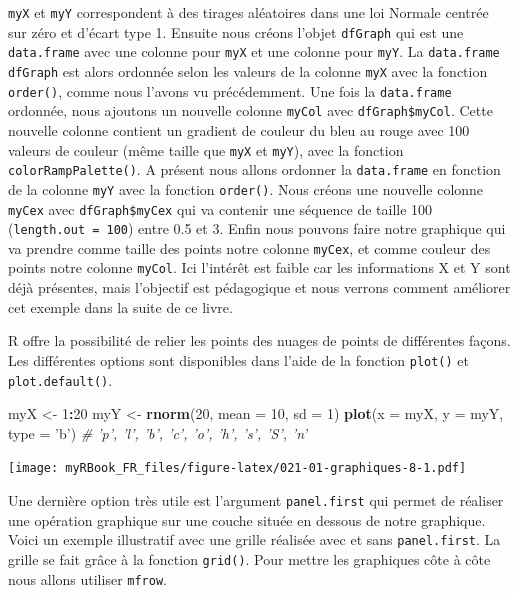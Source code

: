 \documentclass[
]{book}
\newenvironment{Shaded}{\begin{snugshade}}{\end{snugshade}}
\newcommand{\CommentTok}[1]{\textcolor[rgb]{0.56,0.35,0.01}{\textit{#1}}}
\newcommand{\DataTypeTok}[1]{\textcolor[rgb]{0.13,0.29,0.53}{#1}}
\newcommand{\DecValTok}[1]{\textcolor[rgb]{0.00,0.00,0.81}{#1}}
\newcommand{\KeywordTok}[1]{\textcolor[rgb]{0.13,0.29,0.53}{\textbf{#1}}}
\newcommand{\NormalTok}[1]{#1}
\newcommand{\OperatorTok}[1]{\textcolor[rgb]{0.81,0.36,0.00}{\textbf{#1}}}
\newcommand{\StringTok}[1]{\textcolor[rgb]{0.31,0.60,0.02}{#1}}
\begin{document}
\texttt{myX} et \texttt{myY} correspondent à des tirages aléatoires dans une loi Normale centrée sur zéro et d'écart type 1. Ensuite nous créons l'objet \texttt{dfGraph} qui est une \texttt{data.frame} avec une colonne pour \texttt{myX} et une colonne pour \texttt{myY}. La \texttt{data.frame} \texttt{dfGraph} est alors ordonnée selon les valeurs de la colonne \texttt{myX} avec la fonction \texttt{order()}, comme nous l'avons vu précédemment. Une fois la \texttt{data.frame} ordonnée, nous ajoutons un nouvelle colonne \texttt{myCol} avec \texttt{dfGraph\$myCol}. Cette nouvelle colonne contient un gradient de couleur du bleu au rouge avec 100 valeurs de couleur (même taille que \texttt{myX} et \texttt{myY}), avec la fonction \texttt{colorRampPalette()}. A présent nous allons ordonner la \texttt{data.frame} en fonction de la colonne \texttt{myY} avec la fonction \texttt{order()}. Nous créons une nouvelle colonne \texttt{myCex} avec \texttt{dfGraph\$myCex} qui va contenir une séquence de taille 100 (\texttt{length.out\ =\ 100}) entre 0.5 et 3. Enfin nous pouvons faire notre graphique qui va prendre comme taille des points notre colonne \texttt{myCex}, et comme couleur des points notre colonne \texttt{myCol}. Ici l'intérêt est faible car les informations X et Y sont déjà présentes, mais l'objectif est pédagogique et nous verrons comment améliorer cet exemple dans la suite de ce livre.

R offre la possibilité de relier les points des nuages de points de différentes façons. Les différentes options sont disponibles dans l'aide de la fonction \texttt{plot()} et \texttt{plot.default()}.

\begin{Shaded}
\begin{Highlighting}[]
\NormalTok{myX <-}\StringTok{ }\DecValTok{1}\OperatorTok{:}\DecValTok{20}
\NormalTok{myY <-}\StringTok{ }\KeywordTok{rnorm}\NormalTok{(}\DecValTok{20}\NormalTok{, }\DataTypeTok{mean =} \DecValTok{10}\NormalTok{, }\DataTypeTok{sd =} \DecValTok{1}\NormalTok{)}
\KeywordTok{plot}\NormalTok{(}\DataTypeTok{x =}\NormalTok{ myX, }\DataTypeTok{y =}\NormalTok{ myY, }
  \DataTypeTok{type =} \StringTok{'b'}\NormalTok{) }\CommentTok{# 'p', 'l', 'b', 'c', 'o', 'h', 's', 'S', 'n'}
\end{Highlighting}
\end{Shaded}

\texttt{[image: myRBook\_FR\_files/figure-latex/021-01-graphiques-8-1.pdf]}

Une dernière option très utile est l'argument \texttt{panel.first} qui permet de réaliser une opération graphique sur une couche située en dessous de notre graphique. Voici un exemple illustratif avec une grille réalisée avec et sans \texttt{panel.first}. La grille se fait grâce à la fonction \texttt{grid()}. Pour mettre les graphiques côte à côte nous allons utiliser \texttt{mfrow}.
\end{document}
